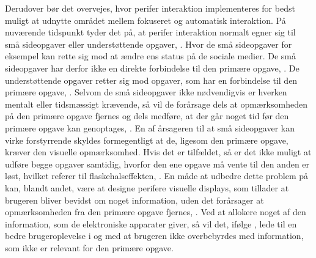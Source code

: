Derudover bør det overvejes, hvor perifer interaktion implementeres for bedst muligt at udnytte området mellem fokuseret og automatisk interaktion. På nuværende tidspunkt tyder det på, at perifer interaktion normalt egner sig til små sideopgaver eller understøttende opgaver, \parencite[s. 21]{PDF:EvaluatingPI}. Hvor de små sideopgaver for eksempel kan rette sig mod at ændre ens status på de sociale medier. De små sideopgaver har derfor ikke en direkte forbindelse til den primære opgave, \parencite[s. 162]{PDF:ComparingInputModalities}. De understøttende opgaver retter sig mod opgaver, som har en forbindelse til den primære opgave, \parencite[s. 21]{PDF:EvaluatingPI}. Selvom de små sideopgaver ikke nødvendigvis er hverken mentalt eller tidsmæssigt krævende, så vil de forårsage dels at opmærksomheden på den primære opgave fjernes og dels medføre, at der går noget tid før den primære opgave kan genoptages, \parencite[s. 162]{PDF:ComparingInputModalities}. En af årsageren til at små sideopgaver kan virke forstyrrende skyldes formegentligt at de, ligesom den primære opgave, kræver den visuelle opmærksomhed. Hvis det er tilfældet, så er det ikke muligt at udføre begge opgaver samtidig, hvorfor den ene opgave må vente til den anden er løst, hvilket referer til flaskehalseffekten, \parencite[s. 240]{PDF:PICharacteristicsAndConsiderations}. En måde at udbedre dette problem på kan, blandt andet, være at designe perifere visuelle displays, som tillader at brugeren bliver bevidst om noget information, uden det forårsager at opmærksomheden fra den primære opgave fjernes, \parencite[s. 247]{PDF:AToolkitForManaging}. Ved at allokere noget af den information, som de elektroniske apparater giver, så vil det, ifølge \textcite[s. 55]{PDF:PITheoriesKap3}, lede til en bedre brugeroplevelse i og med at brugeren ikke overbebyrdes med information, som ikke er relevant for den primære opgave. 

